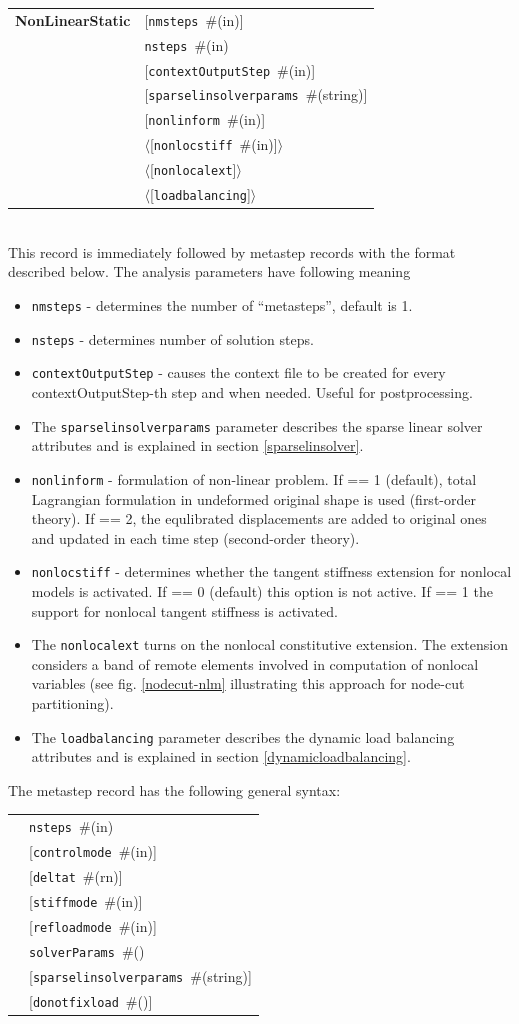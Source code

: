 \documentclass[a4paper]{article}
\makeatletter
\newcommand{\param}[1]{\texttt{#1}} %
\newcommand{\optional}[1]{[#1]} %
\newcommand{\field}[2]{\param{#1}~\#{\tiny(#2)}} %
\newcommand{\optField}[2]{\optional{\field{#1}{#2}}}
\newcommand{\optFieldnotype}[1]{[\param{#1}]}
\newcommand{\componentNum}{(\param{num}\#){\tiny(in)}} %
\newcommand{\entKeywordInst}[1]{\textbf{#1}} %
\newcommand{\Pmode}[1]{{\sffamily #1}}
\newcommand{\oofemParallel}[1]{$\langle${#1}$\rangle$}
\newcommand{\PoptField}[2]{\oofemParallel{\optField{#1}{#2}}}
\newcommand{\PoptFieldnotype}[1]{\oofemParallel{\optFieldnotype{#1}}}
\newenvironment{record}[1][]{\begin{tabular}{|ll}}{\end{tabular}\\}
\newcommand{\recentry}[2]{{#1}&{#2}\\}
\newcounter{rcc}
\newenvironment{record}[1][\textwidth]{\setcounter{rcc}{0}\begin{tabular*}{#1}{|ll@{\extracolsep{\fill}}r}}{\end{tabular*}\\}
\newcommand{\recentry}[2]{\ifthenelse{\value{rcc}>0}{&$\backslash$ \\}{\setcounter{rcc}{1}}{#1}&{#2}}
\makeatother
\begin{document}
\noindent
\begin{record}
  \recentry{\entKeywordInst{NonLinearStatic}}{\optField{nmsteps}{in}}
  \recentry{}{\field{nsteps}{in}}
  \recentry{}{\optField{contextOutputStep}{in}}
  \recentry{}{\optField{sparselinsolverparams}{string}}
  \recentry{}{\optField{nonlinform}{in}}
  \recentry{}{\PoptField{nonlocstiff}{in}}
  \recentry{}{\PoptFieldnotype{nonlocalext}}
  \recentry{}{\PoptFieldnotype{loadbalancing}}
\end{record}
This record is immediately followed by metastep records with the format described below.
The analysis parameters have following meaning
\begin{itemize}
\item \param{nmsteps} - determines the number of
``metasteps'', default is 1.
\item \param{nsteps} - determines number of solution steps.
\item \param{contextOutputStep} - causes the context file to be
created for every con\-text\-Out\-put\-Step-th step and when needed. Useful for
postprocessing.
\item The  \param{sparselinsolverparams} parameter describes the sparse
linear solver attributes and is explained in section \ref{sparselinsolver}.
\item \param{nonlinform} - formulation of non-linear problem. If == 1 (default), total Lagrangian formulation in undeformed original shape is used (first-order theory). If == 2, the equlibrated displacements are added to original ones and updated in each time step (second-order theory).
\item \Pmode{\param{nonlocstiff} - determines whether the tangent stiffness
extension for nonlocal models is activated. If == 0 (default) this
option is not active. If == 1 the support for nonlocal tangent
stiffness is activated.}
\item \Pmode{The \param{nonlocalext} turns on the nonlocal constitutive
extension. The extension considers a band of remote elements involved
in computation of nonlocal variables (see fig. \ref{nodecut-nlm} illustrating
this approach for node-cut partitioning)}.
\item \Pmode{The  \param{loadbalancing} parameter describes the dynamic load balancing
attributes and is explained in section \ref{dynamicloadbalancing}}.
\end{itemize}

\noindent
The metastep record has the following general syntax:\\
\begin{record}
  \recentry{\hspace{10mm}}{\field{nsteps}{in}}
  \recentry{}{\optField{controlmode}{in}}
  \recentry{}{\optField{deltat}{rn}}
  \recentry{}{\optField{stiffmode}{in}}
  \recentry{}{\optField{refloadmode}{in}}
  \recentry{}{\field{solverParams}{}}
  \recentry{}{\optField{sparselinsolverparams}{string}}
  \recentry{}{\optField{donotfixload}{}}
\end{record}
\end{document}

